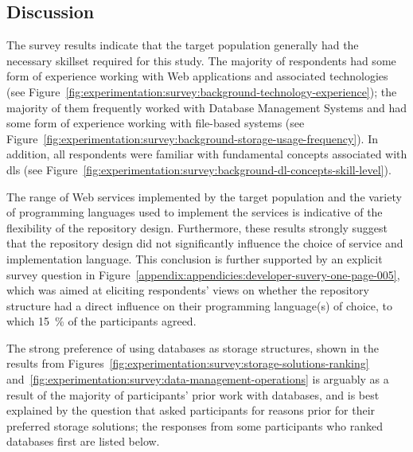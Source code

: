 
\subsection{Discussion}
\label{sec:evaluation:developer-survey:discussion}

The survey results indicate that the target population generally had the necessary skillset required for this study. The majority of respondents had some form of experience working with Web applications and associated technologies (see Figure~\ref{fig:experimentation:survey:background-technology-experience}); the majority of them frequently worked with Database Management Systems and had some form of experience working with file-based systems (see Figure~\ref{fig:experimentation:survey:background-storage-usage-frequency}). In addition, all respondents were familiar with fundamental concepts associated with \glspl{dl} (see Figure~\ref{fig:experimentation:survey:background-dl-concepts-skill-level}).

The range of Web services implemented by the target population and the variety of programming languages used to implement the services is indicative of the flexibility of the repository design. Furthermore, these results strongly suggest that the repository design did not significantly influence the choice of service and implementation language. This conclusion is further supported by an explicit survey question in Figure~\ref{appendix:appendicies:developer-suvery-one-page-005}, which was aimed at eliciting respondents' views on whether the repository structure had a direct influence on their programming language(s) of choice, to which \SI{15}{\percent} of the participants agreed.

The strong preference of using databases as storage structures, shown in the results from Figures~\ref{fig:experimentation:survey:storage-solutions-ranking} and~\ref{fig:experimentation:survey:data-management-operations} is arguably as a result of the majority of participants' prior work with databases, and is best explained by the question that asked participants for reasons prior for their preferred storage solutions; the responses from some participants who ranked databases first are listed below.

